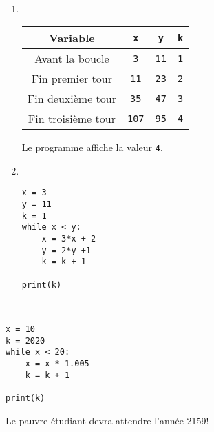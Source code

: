 \begin{correction}~
	\begin{enumerate}
			\item ~\begin{center}
		\begin{tabular}{|c|c|c|c|}
			\hline
			Variable &\texttt{x}&\texttt{y}&\texttt{k} \\\hline
			Avant la boucle     &\texttt{3}&\texttt{11}&\texttt{1}\\\hline
			Fin premier tour    &\texttt{11}&\texttt{23}&\texttt{2}\\\hline
			Fin deuxième tour   &\texttt{35}&\texttt{47}&\texttt{3}\\\hline
			Fin troisième tour &\texttt{107}&\texttt{95}&\texttt{4}\\\hline
		\end{tabular}			\end{center}
		
		Le programme affiche la valeur \texttt{4}.
			\item~
	\begin{center}
		\begin{varwidth}[t]{\textwidth}
	\begin{lstlisting}[language=iPython,linewidth = 5cm]
x = 3
y = 11
k = 1
while x < y:
    x = 3*x + 2
    y = 2*y +1
    k = k + 1

print(k)
\end{lstlisting}
		\end{varwidth}
\end{center}
	\end{enumerate}
\end{correction}


\begin{correction}~
	\begin{center}
		\begin{varwidth}[t]{\textwidth}
	\begin{lstlisting}[language=iPython,linewidth = 5cm]
x = 10
k = 2020
while x < 20:
    x = x * 1.005
    k = k + 1

print(k)
\end{lstlisting}
		\end{varwidth}
\end{center}

Le pauvre étudiant devra attendre l'année 2159!
\end{correction}


